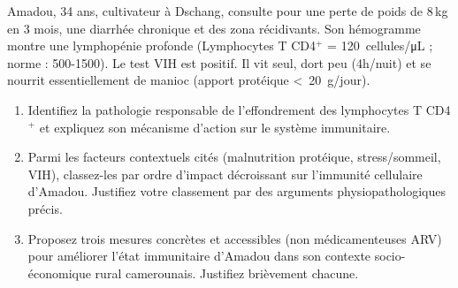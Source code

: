 \documentclass[11pt]{article}
\begin{document}
\begin{exercice}
Amadou, 34 ans, cultivateur à Dschang, consulte pour une perte de poids de 8\,kg en 3 mois, une diarrhée chronique et des zona récidivants. Son hémogramme montre une lymphopénie profonde (Lymphocytes T CD4$^+$ = \SI{120}{cellules/\micro\liter} ; norme : 500-1500). Le test VIH est positif. Il vit seul, dort peu (4h/nuit) et se nourrit essentiellement de manioc (apport protéique \textless\ \SI{20}{g/jour}).

\begin{enumerate}
    \item Identifiez la pathologie responsable de l'effondrement des lymphocytes T CD4$^+$ et expliquez son mécanisme d'action sur le système immunitaire.
    \item Parmi les facteurs contextuels cités (malnutrition protéique, stress/sommeil, VIH), classez-les par ordre d'impact décroissant sur l'immunité cellulaire d'Amadou. Justifiez votre classement par des arguments physiopathologiques précis.
    \item Proposez trois mesures concrètes et accessibles (non médicamenteuses ARV) pour améliorer l'état immunitaire d'Amadou dans son contexte socio-économique rural camerounais. Justifiez brièvement chacune.
\end{enumerate}
\end{exercice}
\end{document}
